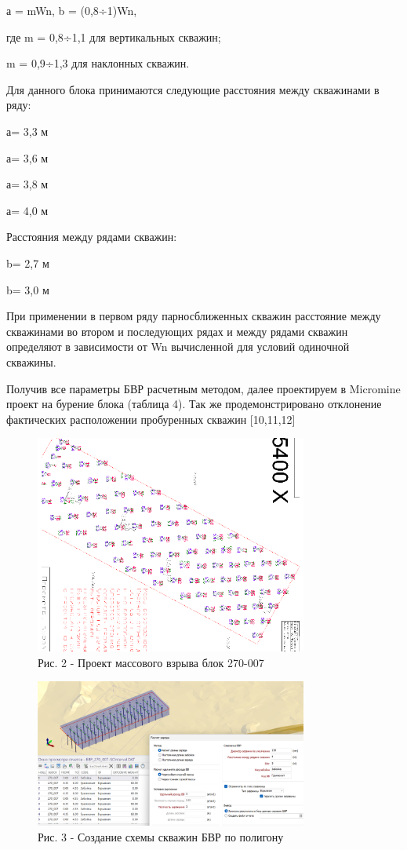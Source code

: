 \begin{multicols}{2}
а = mWn, b = (0,8÷1)Wn,

где m = 0,8÷1,1 для вертикальных скважин;

m = 0,9÷1,3 для наклонных скважин.

Для данного блока принимаются следующие расстояния между скважинами в
ряду:

а= 3,3 м

а= 3,6 м

а= 3,8 м

а= 4,0 м

Расстояния между рядами скважин:

b= 2,7 м

b= 3,0 м

При применении в первом ряду парносближенных скважин расстояние между
скважинами во втором и последующих рядах и между рядами скважин
определяют в зависимости от Wn вычисленной для условий одиночной
скважины.

Получив все параметры БВР расчетным методом, далее проектируем в
Micromine проект на бурение блока (таблица 4). Так же продемонстрировано
отклонение фактических расположении пробуренных скважин {[}10,11,12{]}
\end{multicols}


\begin{figure}[H]
	\centering
	\includegraphics[width=0.8\textwidth]{media/gor/image29}
	\caption*{Рис. 2 - Проект массового взрыва блок 270-007}
\end{figure}


\begin{figure}[H]
	\centering
	\includegraphics[width=0.8\textwidth]{media/gor/image30}
	\caption*{Рис. 3 - Создание схемы скважин БВР по полигону}
\end{figure}

